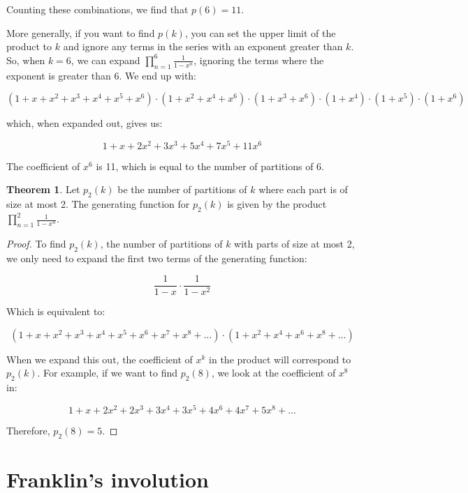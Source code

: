 \documentclass{article}
\theoremstyle{definition}
\newtheorem{theorem}{Theorem}
\begin{document}
\noindent
Counting these combinations, we find that \( p(6) = 11 \).

\noindent
More generally, if you want to find $p(k)$, you can set the upper limit of the product to $k$ and ignore
any terms in the series with an exponent greater than $k$. So, when $k = 6$, we can expand
$\prod_{n=1}^{6} \frac{1}{1-x^n}$, ignoring the terms where the exponent is greater than 6. We end up with:

\[
(1 + x + x^2 + x^3 + x^4 + x^5 + x^6) \cdot (1 + x^2 + x^4 + x^6) \cdot (1 + x^3 + x^6) \cdot (1 + x^4) \cdot 
(1 + x^5) \cdot (1 + x^6)
\]

\noindent
which, when expanded out, gives us:

\[
1 + x + 2x^2 + 3x^3 + 5x^4 + 7x^5 + 11x^6
\]

\noindent
The coefficient of $x^6$ is 11, which is equal to the number of partitions of 6.

\begin{theorem}
Let $p_2(k)$ be the number of partitions of $k$ where each part is of size at most 2. The generating function for 
$p_2(k)$ is given by the product $\prod_{n=1}^{2} \frac{1}{1-x^n}$.
\end{theorem}

\begin{proof}
To find $p_2(k)$, the number of partitions of $k$ with parts of size at most 2, we only need to expand the first two
terms of the generating function:

\[
\frac{1}{1 - x} \cdot \frac{1}{1 - x^2}
\]

\noindent
Which is equivalent to:

\[
(1 + x + x^2 + x^3 + x^4 + x^5 + x^6 + x^7 + x^8 + \dots) \cdot (1 + x^2 + x^4 + x^6 + x^8 + \dots)
\]

\noindent
When we expand this out, the coefficient of $x^k$ in the product will correspond to $p_2(k)$.
For example, if we want to find $p_2(8)$, we look at the coefficient of $x^8$ in:

\[
1 + x + 2x^2 + 2x^3 + 3x^4 + 3x^5 + 4x^6 + 4x^7 + 5x^8 + \dots
\]

\noindent
Therefore, $p_2(8) = 5$.

\end{proof}

\section{Franklin's involution}
\end{document}
